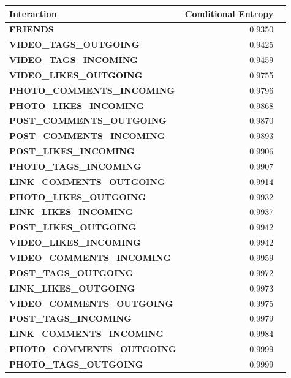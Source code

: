 \begin{table}
	\centering
	\begin{tabular}{| >{\small}l | >{\small}r | >{\small}r |}
	\hline
	\textbf{Interaction} & \textbf{Conditional Entropy}\\
	\hline
	\textbf{FRIENDS} & 0.9350 \\
	\hline
	\textbf{VIDEO\_TAGS\_OUTGOING} & 0.9425 \\
	\hline
	\textbf{VIDEO\_TAGS\_INCOMING} & 0.9459 \\
	\hline
	\textbf{VIDEO\_LIKES\_OUTGOING} & 0.9755 \\
	\hline
	\textbf{PHOTO\_COMMENTS\_INCOMING} & 0.9796 \\
	\hline
	\textbf{PHOTO\_LIKES\_INCOMING} & 0.9868 \\
	\hline
	\textbf{POST\_COMMENTS\_OUTGOING} & 0.9870 \\
	\hline
	\textbf{POST\_COMMENTS\_INCOMING} & 0.9893 \\
	\hline
	\textbf{POST\_LIKES\_INCOMING} & 0.9906 \\
	\hline
	\textbf{PHOTO\_TAGS\_INCOMING} & 0.9907 \\ 
	\hline
	\textbf{LINK\_COMMENTS\_OUTGOING} & 0.9914 \\
	\hline
	\textbf{PHOTO\_LIKES\_OUTGOING} & 0.9932 \\ 
	\hline
	\textbf{LINK\_LIKES\_INCOMING} & 0.9937 \\
	\hline
	\textbf{POST\_LIKES\_OUTGOING} & 0.9942 \\ 
	\hline
	\textbf{VIDEO\_LIKES\_INCOMING} & 0.9942 \\ 
	\hline
	\textbf{VIDEO\_COMMENTS\_INCOMING} & 0.9959 \\ 
	\hline
	\textbf{POST\_TAGS\_OUTGOING} & 0.9972 \\
	\hline
	\textbf{LINK\_LIKES\_OUTGOING} & 0.9973 \\ 
	\hline
	\textbf{VIDEO\_COMMENTS\_OUTGOING} & 0.9975 \\
	\hline
	\textbf{POST\_TAGS\_INCOMING} & 0.9979 \\
	\hline
	\textbf{LINK\_COMMENTS\_INCOMING} & 0.9984 \\
	\hline
	\textbf{PHOTO\_COMMENTS\_OUTGOING} & 0.9999 \\
	\hline
	\textbf{PHOTO\_TAGS\_OUTGOING} & 0.9999 \\
	\hline
	\end{tabular}
	\npnoround
\end{table}

